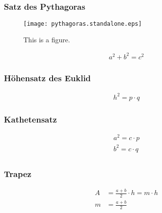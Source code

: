 \subsubsection{Satz des Pythagoras}

\begin{figure}[htb]
\begin{center}
	\texttt{[image: pythagoras.standalone.eps]}
\caption{This is a figure.}
\end{center}
\end{figure}



\begin{align*}
    a^2+b^2=c^2
\end{align*}

\subsubsection{Höhensatz des Euklid}
\begin{align*}
    h^2=p \cdot q
\end{align*}



\subsubsection{Kathetensatz}
\begin{align*}
    a^2=c \cdot p \\
    b^2=c \cdot q \\
\end{align*}

\subsubsection{Trapez}
\begin{align*}
    A &= \frac{a+b}{2} \cdot h = m \cdot h \\
    m &= \frac{a+b}{2}
\end{align*}

